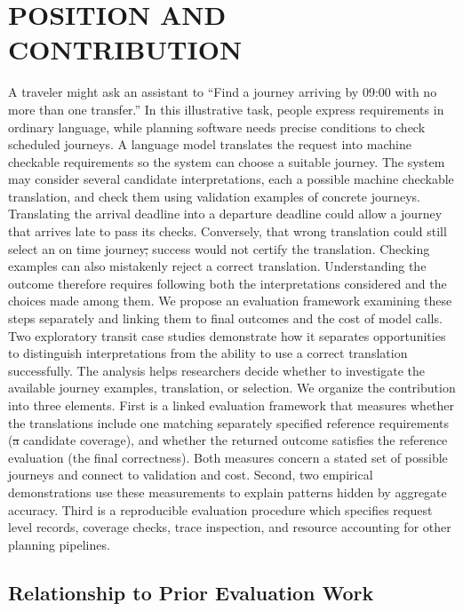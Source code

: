 \documentclass[a4paper,twoside]{article}
\providecommand{\DIFaddtex}[1]{{\protect\color{blue}\uwave{#1}}} %
\providecommand{\DIFdeltex}[1]{{\protect\color{red}\sout{#1}}}                      %
\providecommand{\DIFaddbegin}{} %
\providecommand{\DIFaddend}{} %
\providecommand{\DIFdelbegin}{} %
\providecommand{\DIFdelend}{} %
\providecommand{\DIFadd}[1]{\texorpdfstring{\DIFaddtex{#1}}{#1}} %
\providecommand{\DIFdel}[1]{\texorpdfstring{\DIFdeltex{#1}}{}} %
\begin{document}
\section{\uppercase{Position and Contribution}}
\label{sec:position}
\noindent A traveler might ask an assistant to ``Find a journey arriving by 09:00 with no more than one transfer.'' In this illustrative task, people express requirements in ordinary language, while planning software needs precise conditions to check scheduled journeys. A language model translates the request into machine checkable requirements so the system can choose a suitable journey.
The system may consider several candidate interpretations, each a possible machine checkable translation, and check them using validation examples of concrete journeys. Translating the arrival deadline into a departure deadline could allow a journey that arrives late to pass its checks. Conversely, that wrong translation could still select an on time journey\DIFdelbegin \DIFdel{, }\DIFdelend \DIFaddbegin \DIFadd{; }\DIFaddend success would not certify the translation. Checking examples can also mistakenly reject a correct translation. Understanding the outcome therefore requires following both the interpretations considered and the choices made among them.
We propose an evaluation framework examining these steps separately and linking them to final outcomes and the cost of model calls. Two exploratory transit case studies demonstrate how it separates opportunities to distinguish interpretations from the ability to use a correct translation successfully. The analysis helps researchers decide whether to investigate the available journey examples, translation, or selection. We organize the contribution into three elements.
First is a linked evaluation framework that measures whether the translations include one matching separately specified reference requirements (\DIFdelbegin \DIFdel{a }\DIFdelend candidate coverage), and whether the returned outcome satisfies the reference evaluation (the final correctness). Both measures concern a stated set of possible journeys and connect to validation and cost.
Second, two empirical demonstrations use these measurements to explain patterns hidden by aggregate accuracy.
Third is a reproducible evaluation procedure which specifies request level records, coverage checks, trace inspection, and resource accounting for other planning pipelines.


\subsection{Relationship to Prior Evaluation Work}
\end{document}
